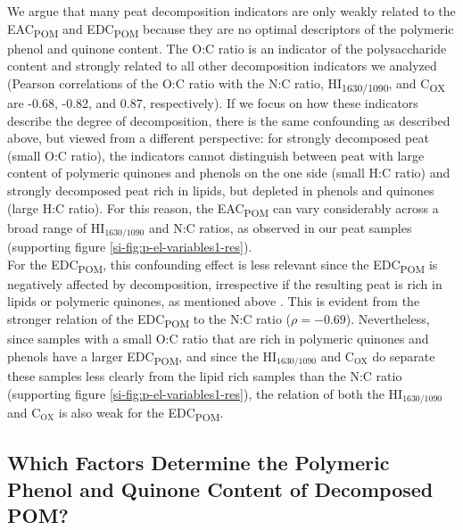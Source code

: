\documentclass[draft,linenumbers]{agujournal2018}
\begin{document}
We argue that many peat decomposition indicators are only weakly related
to the EAC\textsubscript{POM} and EDC\textsubscript{POM} because they
are no optimal descriptors of the polymeric phenol and quinone content.
The O:C ratio is an indicator of the polysaccharide content and strongly
related to all other decomposition indicators we analyzed (Pearson
correlations of the O:C ratio with the N:C ratio,
HI\textsubscript{1630/1090}, and C\textsubscript{OX} are -0.68, -0.82,
and 0.87, respectively). If we focus on how these indicators describe
the degree of decomposition, there is the same confounding as described
above, but viewed from a different perspective: for strongly decomposed
peat (small O:C ratio), the indicators cannot distinguish between peat
with large content of polymeric quinones and phenols on the one side
(small H:C ratio) and strongly decomposed peat rich in lipids, but
depleted in phenols and quinones (large H:C ratio). For this reason, the
EAC\textsubscript{POM} can vary considerably across a broad range of
HI\(_\text{1630/1090}\) and N:C ratios, as observed in our peat samples
(supporting figure \ref{si-fig:p-el-variables1-res}).\\
For the EDC\textsubscript{POM}, this confounding effect is less relevant
since the EDC\textsubscript{POM} is negatively affected by
decomposition, irrespective if the resulting peat is rich in lipids or
polymeric quinones, as mentioned above \citep{Fenner.2011, Bolton.2018}.
This is evident from the stronger relation of the EDC\textsubscript{POM}
to the N:C ratio (\(\rho=-0.69\)). Nevertheless, since samples with a
small O:C ratio that are rich in polymeric quinones and phenols have a
larger EDC\textsubscript{POM}, and since the HI\(_\text{1630/1090}\) and
C\(_\text{OX}\) do separate these samples less clearly from the lipid
rich samples than the N:C ratio (supporting figure
\ref{si-fig:p-el-variables1-res}), the relation of both the
HI\(_\text{1630/1090}\) and C\(_\text{OX}\) is also weak for the
EDC\textsubscript{POM}.

\subsection{Which Factors Determine the Polymeric Phenol and Quinone
Content of Decomposed POM?}
\end{document}
